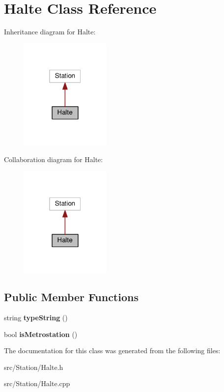 \hypertarget{classHalte}{}\section{Halte Class Reference}
\label{classHalte}


Inheritance diagram for Halte\+:\nopagebreak
\begin{figure}[H]
\begin{center}
\leavevmode
\includegraphics[width=127pt]{classHalte__inherit__graph}
\end{center}
\end{figure}


Collaboration diagram for Halte\+:\nopagebreak
\begin{figure}[H]
\begin{center}
\leavevmode
\includegraphics[width=127pt]{classHalte__coll__graph}
\end{center}
\end{figure}
\subsection*{Public Member Functions}
\begin{DoxyCompactItemize}
\item 
string {\bfseries type\+String} ()\hypertarget{classHalte_a8f1ba2d889f79a81d72d9c401732f8b6}{}\label{classHalte_a8f1ba2d889f79a81d72d9c401732f8b6}

\item 
bool {\bfseries is\+Metrostation} ()\hypertarget{classHalte_a292876fb9d440119c7f6dafe19913e2d}{}\label{classHalte_a292876fb9d440119c7f6dafe19913e2d}

\end{DoxyCompactItemize}


The documentation for this class was generated from the following files\+:\begin{DoxyCompactItemize}
\item 
src/\+Station/Halte.\+h\item 
src/\+Station/Halte.\+cpp\end{DoxyCompactItemize}
